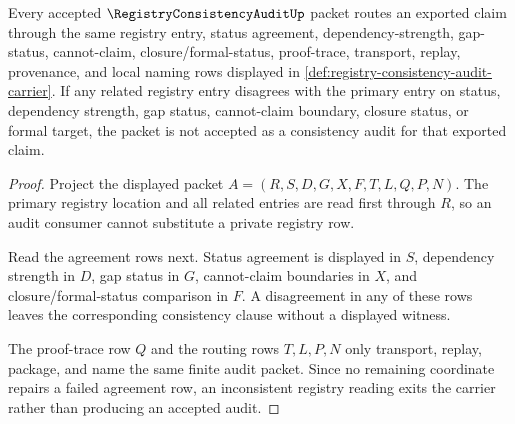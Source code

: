 \begin{theorem}
\label{thm:registry-consistency-audit-route}
Every accepted $\RegistryConsistencyAuditUp$ packet routes an exported claim through the same registry entry, status agreement, dependency-strength, gap-status, cannot-claim, closure/formal-status, proof-trace, transport, replay, provenance, and local naming rows displayed in \autoref{def:registry-consistency-audit-carrier}. If any related registry entry disagrees with the primary entry on status, dependency strength, gap status, cannot-claim boundary, closure status, or formal target, the packet is not accepted as a consistency audit for that exported claim.
\end{theorem}
\begin{proof}
Project the displayed packet $A=(R,S,D,G,X,F,T,L,Q,P,N)$. The primary registry location and all related entries are read first through $R$, so an audit consumer cannot substitute a private registry row.

Read the agreement rows next. Status agreement is displayed in $S$, dependency strength in $D$, gap status in $G$, cannot-claim boundaries in $X$, and closure/formal-status comparison in $F$. A disagreement in any of these rows leaves the corresponding consistency clause without a displayed witness.

The proof-trace row $Q$ and the routing rows $T,L,P,N$ only transport, replay, package, and name the same finite audit packet. Since no remaining coordinate repairs a failed agreement row, an inconsistent registry reading exits the carrier rather than producing an accepted audit.
\end{proof}

